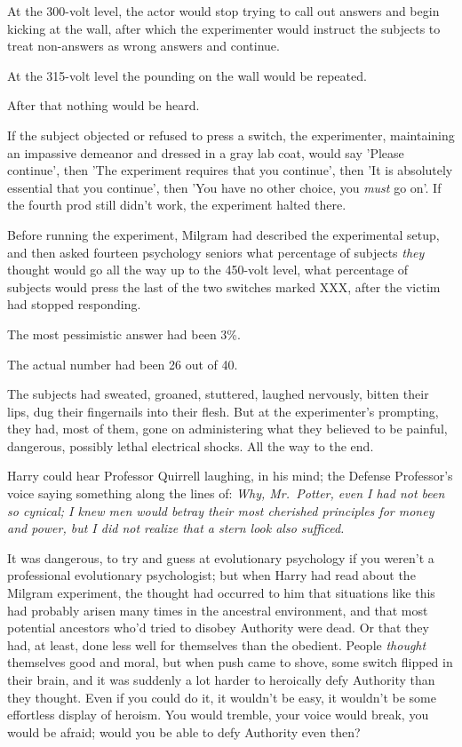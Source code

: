 At the 300-volt level, the actor would stop trying to call out answers and 
begin kicking at the wall, after which the experimenter would instruct the 
subjects to treat non-answers as wrong answers and continue.

At the 315-volt level the pounding on the wall would be repeated.

After that nothing would be heard.

If the subject objected or refused to press a switch, the experimenter, 
maintaining an impassive demeanor and dressed in a gray lab coat, would say 
'Please continue', then 'The experiment requires that you continue', then 'It 
is absolutely essential that you continue', then 'You have no other choice, you 
\emph{must} go on'. If the fourth prod still didn't work, the experiment halted 
there.

Before running the experiment, Milgram had described the experimental setup, 
and then asked fourteen psychology seniors what percentage of subjects 
\emph{they} thought would go all the way up to the 450-volt level, what 
percentage of subjects would press the last of the two switches marked XXX, 
after the victim had stopped responding.

The most pessimistic answer had been 3\%.

The actual number had been 26 out of 40.

The subjects had sweated, groaned, stuttered, laughed nervously, bitten their 
lips, dug their fingernails into their flesh. But at the experimenter's 
prompting, they had, most of them, gone on administering what they believed to 
be painful, dangerous, possibly lethal electrical shocks. All the way to the 
end.

Harry could hear Professor Quirrell laughing, in his mind; the Defense 
Professor's voice saying something along the lines of: \emph{Why, Mr.~Potter, 
even I had not been so cynical; I knew men would betray their most cherished 
principles for money and power, but I did not realize that a stern look also 
sufficed.}

It was dangerous, to try and guess at evolutionary psychology if you weren't a 
professional evolutionary psychologist; but when Harry had read about the 
Milgram experiment, the thought had occurred to him that situations like this 
had probably arisen many times in the ancestral environment, and that most 
potential ancestors who'd tried to disobey Authority were dead. Or that they 
had, at least, done less well for themselves than the obedient. People 
\emph{thought} themselves good and moral, but when push came to shove, some 
switch flipped in their brain, and it was suddenly a lot harder to heroically 
defy Authority than they thought. Even if you could do it, it wouldn't be easy, 
it wouldn't be some effortless display of heroism. You would tremble, your 
voice would break, you would be afraid; would you be able to defy Authority 
even then?

